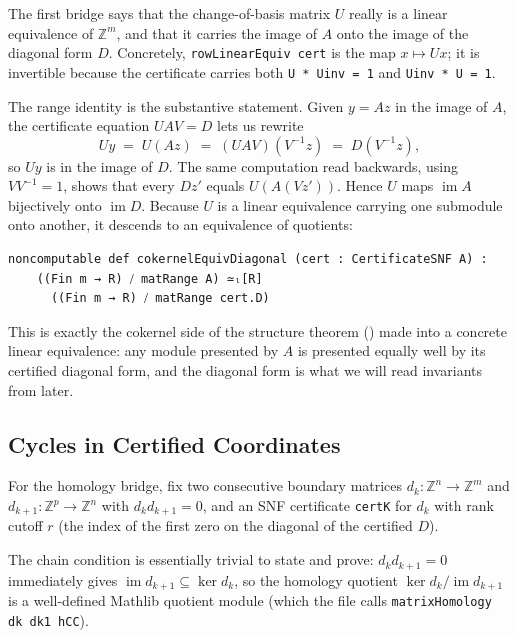 \documentclass[11pt]{article}
\theoremstyle{plain}
\theoremstyle{definition}
\theoremstyle{remark}
\newcommand{\lean}[1]{\lstinline[language=lean]|#1|}
\begin{document}
The first bridge says that the change-of-basis matrix \(U\) really is a linear
equivalence of \(\mathbb{Z}^m\), and that it carries the image of \(A\) onto
the image of the diagonal form \(D\). Concretely, \lean{rowLinearEquiv cert} is
the map \(x \mapsto U x\); it is invertible because the certificate carries
both \lean{U * Uinv = 1} and \lean{Uinv * U = 1}.

The range identity is the substantive statement. Given \(y = A z\) in the image
of \(A\), the certificate equation \(UAV = D\) lets us rewrite
\[
    U y \;=\; U(Az) \;=\; (UAV)(V^{-1}z) \;=\; D(V^{-1}z),
\]
so \(Uy\) is in the image of \(D\). The same computation read backwards, using
\(V V^{-1} = 1\), shows that every \(Dz'\) equals \(U(A(Vz'))\). Hence
\(U\) maps \(\operatorname{im}A\) bijectively onto \(\operatorname{im}D\).
Because \(U\) is a linear equivalence carrying one submodule onto another, it
descends to an equivalence of quotients:

\begin{lstlisting}[caption={The certified diagonal presents the same cokernel.},label={lst:cokernel-equivalence}]
noncomputable def cokernelEquivDiagonal (cert : CertificateSNF A) :
    ((Fin m → R) ⧸ matRange A) ≃ₗ[R]
      ((Fin m → R) ⧸ matRange cert.D)
\end{lstlisting}

This is exactly the cokernel side of the structure theorem
() made into a concrete linear equivalence: any module
presented by \(A\) is presented equally well by its certified diagonal form,
and the diagonal form is what we will read invariants from later.

\subsection{Cycles in Certified Coordinates}

For the homology bridge, fix two consecutive boundary matrices
\(d_k : \mathbb{Z}^n \to \mathbb{Z}^m\) and
\(d_{k+1} : \mathbb{Z}^p \to \mathbb{Z}^n\) with \(d_k d_{k+1} = 0\), and an
SNF certificate \lean{certK} for \(d_k\) with rank cutoff \(r\) (the index of
the first zero on the diagonal of the certified \(D\)).

The chain condition is essentially trivial to state and prove:
\(d_k d_{k+1} = 0\) immediately gives
\(\operatorname{im} d_{k+1} \subseteq \ker d_k\), so the homology quotient
\(\ker d_k / \operatorname{im} d_{k+1}\) is a well-defined Mathlib quotient
module (which the file calls \lean{matrixHomology dk dk1 hCC}).
\end{document}
